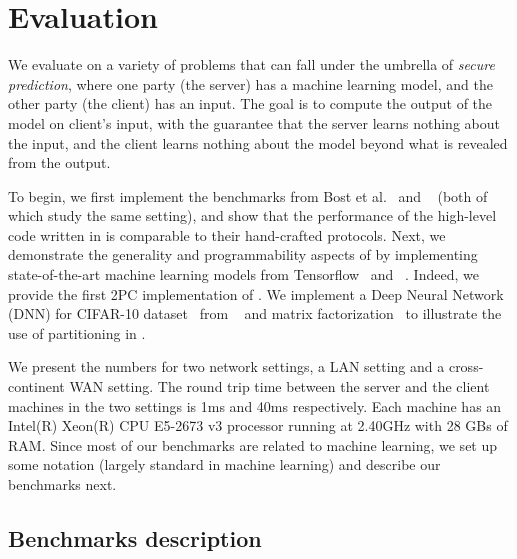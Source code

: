 \section{Evaluation}
\label{sec:eval}
We evaluate \tool on a variety of problems that can fall under the umbrella of {\it secure prediction}, where one
party (the server) has a machine learning model, and the other party
(the client) has an input. The goal is to compute the output of the
model on client's input, with the guarantee that the server
learns nothing about the input, and the client learns nothing
about the model beyond what is revealed from the output.

To begin, we first implement the benchmarks from Bost et al.~\cite{shafindss}
and \minion~\cite{minionn} (both of which study the same setting),
and show that the performance of the high-level code written in \tool
is comparable to their hand-crafted protocols.
%
Next, we demonstrate the generality and programmability aspects of
\tool by implementing state-of-the-art machine learning models from
Tensorflow~\cite{tensorflow} and \bonsai~\cite{bonsai}. Indeed, we
provide the first 2PC implementation of \bonsai.
%
We
implement a Deep Neural Network (DNN) for CIFAR-10
dataset~\cite{cifar} from \minion~\cite{minionn} and matrix factorization~\cite{valeriaMatrix}
to illustrate the use
of partitioning in \tool.

We present the numbers for two network settings, a LAN setting and
a cross-continent WAN setting. The round trip time between the server
and the client machines in the two settings is 1ms and 40ms respectively. Each
machine has an Intel(R) Xeon(R) CPU E5-2673 v3 processor running at
2.40GHz with 28 GBs of RAM.
%
Since most of our benchmarks
are related to machine learning, we set up some notation (largely
standard in machine learning) and describe our benchmarks next.

\subsection{Benchmarks description}

